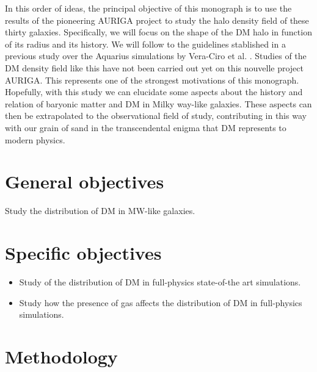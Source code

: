 \documentclass[12pt]{article}
\begin{document}
In this order of ideas, the principal objective of this monograph is to use the results of the pioneering AURIGA project \cite{AURIGA} to study the halo density field of these thirty galaxies.
Specifically, we will focus on the shape of the DM halo in function of its radius and its history.
We will follow to the guidelines stablished in a previous study over the Aquarius simulations by Vera-Ciro et al. \cite{Vera-Ciro et al 2011}. 
Studies of the DM density field like this have not been carried out yet on this nouvelle project AURIGA.
This represents one of the strongest motivations of this monograph.
Hopefully, with this study we can elucidate some aspects about the history and relation of baryonic matter and DM in Milky way-like galaxies.
These aspects can then be extrapolated to the observational field of study, contributing in this way with our grain of sand in the transcendental enigma that DM represents to modern physics.\\




\section{General objectives}


Study the distribution of DM in MW-like galaxies.

\section{Specific objectives}


\begin{itemize}
	\item Study of the distribution of DM in full-physics state-of-the art simulations.

	\item Study how the presence of gas affects the distribution of DM in full-physics simulations.
	
\end{itemize}

\section{Methodology}

\end{document}
